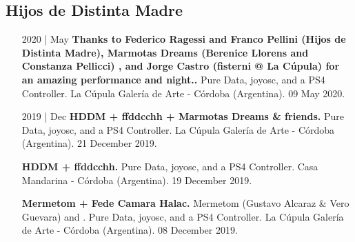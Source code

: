 \documentclass[12pt]{article}%
\begin{document}
\subsection{Hijos de Distinta Madre}%
\begin{itemize}[align=parleft,leftmargin=2.25cm,labelwidth=2cm]
\item[2020 | May]
\textbf{Thanks to Federico Ragessi and Franco Pellini (Hijos de Distinta Madre),  Marmotas Dreams (Berenice Llorens and Constanza Pellicci) , and Jorge Castro (fisterni @ La Cúpula) for an amazing performance and night..}
Pure Data, joyosc, and a PS4 Controller. 
La Cúpula Galería de Arte {-} Córdoba (Argentina). 
09 May 2020.
\end{itemize}%
\begin{itemize}[align=parleft,leftmargin=2.25cm,labelwidth=2cm]
\item[2019 | Dec]
\textbf{HDDM + ffddcchh + Marmotas Dreams \& friends.}
Pure Data, joyosc, and a PS4 Controller. 
La Cúpula Galería de Arte {-} Córdoba (Argentina). 
21 December 2019.
\end{itemize}%
\begin{itemize}[align=parleft,leftmargin=2.25cm,labelwidth=2cm]
\item[]
\textbf{HDDM + ffddcchh.}
Pure Data, joyosc, and a PS4 Controller. 
Casa Mandarina {-} Córdoba (Argentina). 
19 December 2019.
\end{itemize}%
\begin{itemize}[align=parleft,leftmargin=2.25cm,labelwidth=2cm]
\item[]
\textbf{Mermetom + Fede Camara Halac.}
Mermetom (Gustavo Alcaraz \& Vero Guevara) and . 
Pure Data, joyosc, and a PS4 Controller. 
La Cúpula Galería de Arte {-} Córdoba (Argentina). 
08 December 2019.
\end{itemize}%
\end{document}
